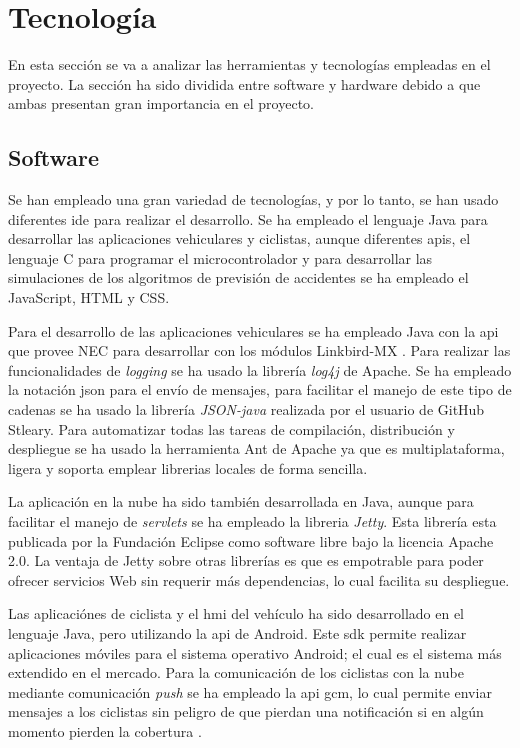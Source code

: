 \section{Tecnología}
En esta sección se va a analizar las herramientas y tecnologías empleadas en
el proyecto. La sección ha sido dividida entre software y hardware debido a que
ambas presentan gran importancia en el proyecto.

\subsection{Software}
Se han empleado una gran variedad de tecnologías, y por lo tanto, se han usado
diferentes \gls{ide} para realizar el desarrollo. Se ha empleado el lenguaje
Java para desarrollar las aplicaciones vehiculares y ciclistas, aunque
diferentes \gls{api}s, el lenguaje C para programar el microcontrolador y
para desarrollar las simulaciones de los algoritmos de previsión de accidentes
se ha empleado el JavaScript, HTML y CSS.

Para el desarrollo de las aplicaciones vehiculares se ha empleado Java con la
\gls{api} que provee NEC para desarrollar con los módulos Linkbird-MX
\cite{14}. Para realizar las funcionalidades de \emph{logging} se ha usado
la librería \emph{log4j} de Apache. Se ha empleado la notación \gls{json} para
el envío de mensajes, para facilitar el manejo de este tipo de cadenas se ha
usado la librería \emph{JSON-java} realizada por el usuario de GitHub
Stleary. Para automatizar todas las tareas de compilación, distribución y
despliegue se ha usado la herramienta Ant de Apache ya que es multiplataforma,
ligera y soporta emplear librerias locales de forma sencilla.

La aplicación en la nube ha sido también desarrollada en Java, aunque para
facilitar el manejo de \emph{servlets} se ha empleado la libreria \emph{Jetty}.
Esta librería esta publicada por la Fundación Eclipse como software libre
bajo la licencia Apache 2.0. La ventaja de Jetty sobre otras librerías es que
es empotrable para poder ofrecer servicios Web sin requerir más dependencias,
lo cual facilita su despliegue.

Las aplicaciónes de ciclista y el \gls{hmi} del vehículo ha sido desarrollado
en el lenguaje Java, pero utilizando la \gls{api} de Android. Este \gls{sdk}
permite realizar aplicaciones móviles para el sistema operativo Android; el
cual es el sistema más extendido en el mercado. Para la comunicación de los
ciclistas con la nube mediante comunicación \emph{push} se ha empleado la
\gls{api} \gls{gcm}, lo cual permite enviar mensajes a los ciclistas sin
peligro de que pierdan una notificación si en algún momento pierden la
cobertura \cite{15}.

